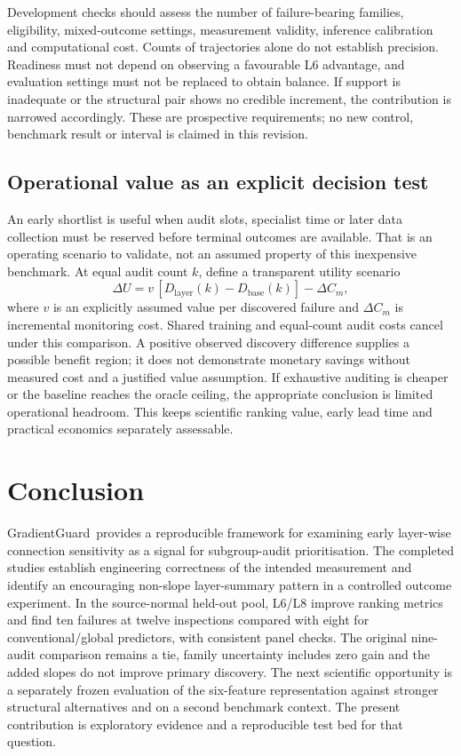 \documentclass[nolineno]{ieeeaccess}
\newcommand{\GG}{GradientGuard}
\begin{document}
Development checks should assess the number of failure-bearing families, eligibility, mixed-outcome settings, measurement validity, inference calibration and computational cost. Counts of trajectories alone do not establish precision. Readiness must not depend on observing a favourable L6 advantage, and evaluation settings must not be replaced to obtain balance. If support is inadequate or the structural pair shows no credible increment, the contribution is narrowed accordingly. These are prospective requirements; no new control, benchmark result or interval is claimed in this revision.

\subsection{Operational value as an explicit decision test}
An early shortlist is useful when audit slots, specialist time or later data collection must be reserved before terminal outcomes are available. That is an operating scenario to validate, not an assumed property of this inexpensive benchmark. At equal audit count $k$, define a transparent utility scenario
\begin{equation}
\Delta U=v\,[D_{\mathrm{layer}}(k)-D_{\mathrm{base}}(k)]-\Delta C_m,
\end{equation}
where $v$ is an explicitly assumed value per discovered failure and $\Delta C_m$ is incremental monitoring cost. Shared training and equal-count audit costs cancel under this comparison. A positive observed discovery difference supplies a possible benefit region; it does not demonstrate monetary savings without measured cost and a justified value assumption. If exhaustive auditing is cheaper or the baseline reaches the oracle ceiling, the appropriate conclusion is limited operational headroom. This keeps scientific ranking value, early lead time and practical economics separately assessable.

\section{Conclusion}
\GG\ provides a reproducible framework for examining early layer-wise connection sensitivity as a signal for subgroup-audit prioritisation. The completed studies establish engineering correctness of the intended measurement and identify an encouraging non-slope layer-summary pattern in a controlled outcome experiment. In the source-normal held-out pool, L6/L8 improve ranking metrics and find ten failures at twelve inspections compared with eight for conventional/global predictors, with consistent panel checks. The original nine-audit comparison remains a tie, family uncertainty includes zero gain and the added slopes do not improve primary discovery. The next scientific opportunity is a separately frozen evaluation of the six-feature representation against stronger structural alternatives and on a second benchmark context. The present contribution is exploratory evidence and a reproducible test bed for that question.
\end{document}
